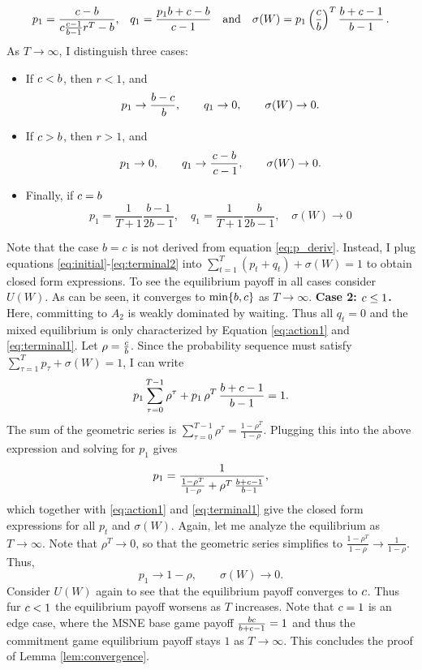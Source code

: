 \documentclass[main.tex]{subfiles}
\begin{document}
\begin{equation*}
p_1 = \frac{c - b}{c \frac{c-1}{b-1}r^T-b} 
 \text{,} \quad 
q_1 = \frac{p_1 b + c - b}{c - 1}
\quad \text{and} \quad 
\sigma(W) = p_1\left(\frac{c}{b}\right)^T\frac{b + c - 1}{b-1}  \,.
\end{equation*}
As $T\to\infty$, I distinguish three cases:
\begin{itemize}
    \item If $c<b$, then $r<1$, and
    \[
    p_1 \to \frac{b-c}{\,b},\qquad q_1 \to 0,\qquad \sigma(W) \to 0.
    \]
    \item If $c>b$, then $r>1$, and
    \[
    p_1 \to 0,\qquad q_1 \to \frac{c-b}{\,c-1},\qquad \sigma(W) \to 0.
    \]
    \item Finally, if $c=b$
    \[
    p_1=\frac{1}{T+1}\frac{b-1}{2b-1}, \quad q_1 = \frac{1}{T+1}\frac{b}{2b-1}, \quad \sigma(W)\to 0
\]
\end{itemize}
Note that the case $b=c$ is not derived from equation \ref{eq:p_deriv}. Instead, I plug equations \ref{eq:initial}-\ref{eq:terminal2} into $\sum_{t=1}^T(p_t+q_t)+\sigma(W)=1$ to obtain closed form expressions. To see the equilibrium payoff in all cases consider $U(W)$. As can be seen, it converges to $\min\{b,c\}$ as $T\to\infty$.
\newline
\newline
\textbf{Case 2: $c\leq1$.}
Here, committing to $A_2$ is weakly dominated by waiting. Thus all $q_t=0$ and the mixed equilibrium is only characterized by Equation \ref{eq:action1} and \ref{eq:terminal1}.
Let $\rho=\frac{c}{b}$. Since the probability sequence must satisfy $ \sum_{\tau=1}^{T} p_\tau + \sigma(W) = 1 $, I can write 
$$
p_1\sum_{\tau=0}^{T-1} \rho^\tau + p_1\,\rho^{T}\,\frac{b+c-1}{b-1} = 1.
$$
The sum of the geometric series is $\sum_{\tau=0}^{T-1} \rho^\tau = \frac{1-\rho^{T}}{1-\rho}$. Plugging this into the above expression and solving for $p_1$ gives 
\[
p_1 = \frac{1}{\frac{1-\rho^{T}}{1-\rho} + \rho^{T}\,\frac{b+c-1}{b-1}},
\]
which together with \ref{eq:action1} and \ref{eq:terminal1} give the closed form expressions for all $p_t$ and $\sigma(W)$.
Again, let me analyze the equilibrium as $T\to\infty$. Note that $\rho^{T}\to 0$, so that the geometric series simplifies to $\frac{1-\rho^{T}}{1-\rho}\to \frac{1}{1-\rho}$. Thus,
\[
p_1\to 1-\rho,\qquad \sigma(W) \to 0.
\]
Consider $U(W)$ again to see that the equilibrium payoff converges to $c$. Thus fur $c<1$ the equilibrium payoff worsens as $T$ increases. Note that $c=1$ is an edge case, where the MSNE base game payoff $\frac{bc}{b+c-1}=1$ and thus the commitment game equilibrium payoff stays $1$ as $T\to\infty$. This concludes the proof of Lemma \ref{lem:convergence}.
\end{document}
